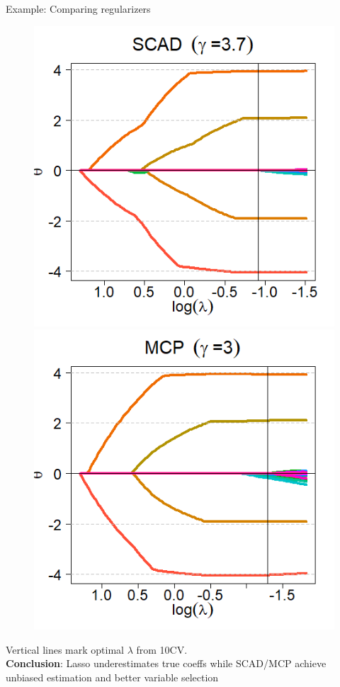 \documentclass[11pt,compress,t,notes=noshow, xcolor=table]{beamer}
\begin{document}
\begin{vbframe}{Example: Comparing regularizers}
\begin{figure}[h]
\begin{minipage}{0.32\linewidth}
      \centerline{\includegraphics[width=\textwidth]{figure/ncpen-compar-SCAD.png}}
    \end{minipage}
    \begin{minipage}{0.32\linewidth}
      \vspace{3pt}
      \centerline{\includegraphics[width=\textwidth]{figure/ncpen-compar-mcp.png}}
    \end{minipage}
  \end{figure}
Vertical lines mark optimal $\lambda$ from 10CV.\\
\vspace{0.1cm}
\textbf{Conclusion}: Lasso underestimates true coeffs while SCAD/MCP achieve unbiased estimation and better variable selection


\end{vbframe}
\end{document}
